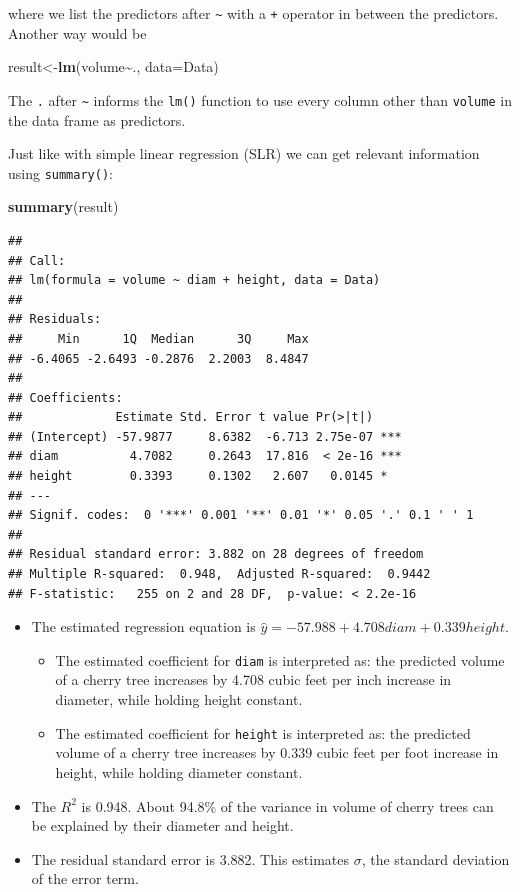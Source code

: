 \documentclass[
]{book}
\newenvironment{Shaded}{\begin{snugshade}}{\end{snugshade}}
\newcommand{\AttributeTok}[1]{\textcolor[rgb]{0.13,0.29,0.53}{#1}}
\newcommand{\FunctionTok}[1]{\textcolor[rgb]{0.13,0.29,0.53}{\textbf{#1}}}
\newcommand{\NormalTok}[1]{#1}
\newcommand{\OtherTok}[1]{\textcolor[rgb]{0.56,0.35,0.01}{#1}}
\newcommand{\SpecialCharTok}[1]{\textcolor[rgb]{0.81,0.36,0.00}{\textbf{#1}}}
\providecommand{\tightlist}{%
  \setlength{\itemsep}{0pt}\setlength{\parskip}{0pt}}
\begin{document}
where we list the predictors after \texttt{\textasciitilde{}} with a \texttt{+} operator in between the predictors. Another way would be

\begin{Shaded}
\begin{Highlighting}[]
\NormalTok{result}\OtherTok{\textless{}{-}}\FunctionTok{lm}\NormalTok{(volume}\SpecialCharTok{\textasciitilde{}}\NormalTok{., }\AttributeTok{data=}\NormalTok{Data)}
\end{Highlighting}
\end{Shaded}

The \texttt{.} after \texttt{\textasciitilde{}} informs the \texttt{lm()} function to use every column other than \texttt{volume} in the data frame as predictors.

Just like with simple linear regression (SLR) we can get relevant information using \texttt{summary()}:

\begin{Shaded}
\begin{Highlighting}[]
\FunctionTok{summary}\NormalTok{(result)}
\end{Highlighting}
\end{Shaded}

\begin{verbatim}
## 
## Call:
## lm(formula = volume ~ diam + height, data = Data)
## 
## Residuals:
##     Min      1Q  Median      3Q     Max 
## -6.4065 -2.6493 -0.2876  2.2003  8.4847 
## 
## Coefficients:
##             Estimate Std. Error t value Pr(>|t|)    
## (Intercept) -57.9877     8.6382  -6.713 2.75e-07 ***
## diam          4.7082     0.2643  17.816  < 2e-16 ***
## height        0.3393     0.1302   2.607   0.0145 *  
## ---
## Signif. codes:  0 '***' 0.001 '**' 0.01 '*' 0.05 '.' 0.1 ' ' 1
## 
## Residual standard error: 3.882 on 28 degrees of freedom
## Multiple R-squared:  0.948,  Adjusted R-squared:  0.9442 
## F-statistic:   255 on 2 and 28 DF,  p-value: < 2.2e-16
\end{verbatim}

\begin{itemize}
\tightlist
\item
  The estimated regression equation is \(\hat{y} = -57.988 + 4.708 diam + 0.339height\).

  \begin{itemize}
  \tightlist
  \item
    The estimated coefficient for \texttt{diam} is interpreted as: the predicted volume of a cherry tree increases by 4.708 cubic feet per inch increase in diameter, while holding height constant.
  \item
    The estimated coefficient for \texttt{height} is interpreted as: the predicted volume of a cherry tree increases by 0.339 cubic feet per foot increase in height, while holding diameter constant.
  \end{itemize}
\item
  The \(R^2\) is 0.948. About 94.8\% of the variance in volume of cherry trees can be explained by their diameter and height.
\item
  The residual standard error is 3.882. This estimates \(\sigma\), the standard deviation of the error term.
\end{itemize}
\end{document}
